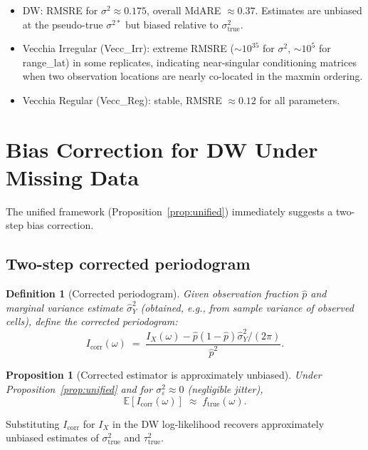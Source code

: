 \documentclass[12pt]{article}
\newtheorem{proposition}{Proposition}
\newtheorem{definition}{Definition}
\begin{document}
\begin{itemize}
  \item DW: RMSRE for $\sigma^2 \approx 0.175$, overall MdARE $\approx 0.37$.
        Estimates are unbiased at the pseudo-true $\sigma^{2*}$ but
        biased relative to $\sigma^2_{\mathrm{true}}$.
  \item Vecchia Irregular (Vecc\_Irr): extreme RMSRE
        ($\sim 10^{35}$ for $\sigma^2$, $\sim 10^5$ for range\_lat) in
        some replicates, indicating near-singular conditioning matrices
        when two observation locations are nearly co-located in the
        maxmin ordering.
  \item Vecchia Regular (Vecc\_Reg): stable, RMSRE $\approx 0.12$
        for all parameters.
\end{itemize}


\section{Bias Correction for DW Under Missing Data}

The unified framework (Proposition~\ref{prop:unified}) immediately
suggests a two-step bias correction.

\subsection{Two-step corrected periodogram}

\begin{definition}[Corrected periodogram]
Given observation fraction $\hat{p}$ and marginal variance estimate
$\hat{\sigma}^2_Y$ (obtained, e.g., from sample variance of observed
cells), define the \emph{corrected periodogram}:
\[
  I_{\mathrm{corr}}(\omega)
  \;=\; \frac{I_X(\omega) - \hat{p}(1-\hat{p})\hat{\sigma}^2_Y / (2\pi)}
             {\hat{p}^2}.
\]
\end{definition}

\begin{proposition}[Corrected estimator is approximately unbiased]
Under Proposition~\ref{prop:unified} and for $\sigma^2_\varepsilon \approx 0$
(negligible jitter),
\[
  \mathbb{E}[I_{\mathrm{corr}}(\omega)] \;\approx\; f_{\mathrm{true}}(\omega).
\]
\end{proposition}

Substituting $I_{\mathrm{corr}}$ for $I_X$ in the DW log-likelihood
recovers approximately unbiased estimates of $\sigma^2_{\mathrm{true}}$
and $\tau^2_{\mathrm{true}}$.
\end{document}
